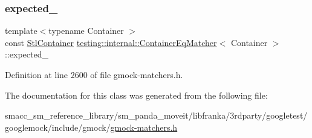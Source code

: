 \subsubsection{\texorpdfstring{expected\+\_\+}{expected\_}}
{\footnotesize\ttfamily template$<$typename Container $>$ \\
const \hyperlink{classtesting_1_1internal_1_1ContainerEqMatcher_a8352d0190c372578d9a9a8457e0810db}{Stl\+Container} \hyperlink{classtesting_1_1internal_1_1ContainerEqMatcher}{testing\+::internal\+::\+Container\+Eq\+Matcher}$<$ Container $>$\+::expected\+\_\+\hspace{0.3cm}{\ttfamily [private]}}



Definition at line 2600 of file gmock-\/matchers.\+h.



The documentation for this class was generated from the following file\+:\begin{DoxyCompactItemize}
\item 
smacc\+\_\+sm\+\_\+reference\+\_\+library/sm\+\_\+panda\+\_\+moveit/libfranka/3rdparty/googletest/googlemock/include/gmock/\hyperlink{gmock-matchers_8h}{gmock-\/matchers.\+h}\end{DoxyCompactItemize}
